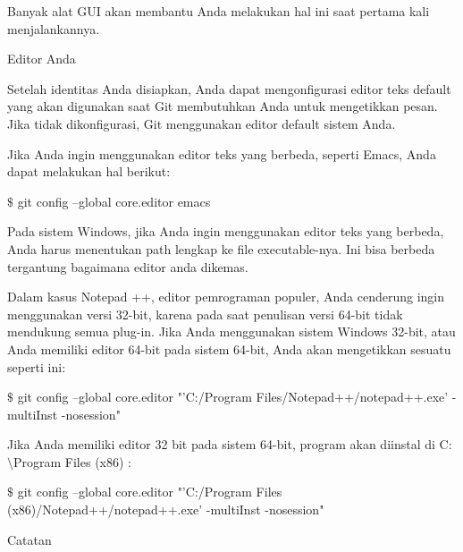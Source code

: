 \vspace{12pt}
\noindent 
Banyak alat GUI akan membantu Anda melakukan hal ini saat pertama kali menjalankannya. \par
\vspace{12pt}
\noindent 
Editor Anda \par
\vspace{12pt}
\noindent 
Setelah identitas Anda disiapkan, Anda dapat mengonfigurasi editor teks default yang akan digunakan saat Git membutuhkan Anda untuk mengetikkan pesan. $  $Jika tidak dikonfigurasi, Git menggunakan editor default sistem Anda. \par
\vspace{12pt}
\noindent 
Jika Anda ingin menggunakan editor teks yang berbeda, seperti Emacs, Anda dapat melakukan hal berikut: \par
\vspace{12pt}
\noindent 
  $  \$  $ git config --global core.editor emacs  \par
\vspace{12pt}
\noindent 
Pada sistem Windows, jika Anda ingin menggunakan editor teks yang berbeda, Anda harus menentukan path lengkap ke file executable-nya. $  $Ini bisa berbeda tergantung bagaimana editor anda dikemas. \par
\vspace{12pt}
\noindent 
Dalam kasus Notepad ++, editor pemrograman populer, Anda cenderung ingin menggunakan versi 32-bit, karena pada saat penulisan versi 64-bit tidak mendukung semua plug-in. $  $Jika Anda menggunakan sistem Windows 32-bit, atau Anda memiliki editor 64-bit pada sistem 64-bit, Anda akan mengetikkan sesuatu seperti ini: \par
\vspace{12pt}
\noindent 
  $  \$  $ git config --global core.editor "'C:/Program Files/Notepad++/notepad++.exe' -multiInst -nosession"  \par
\vspace{12pt}
\noindent 
Jika Anda memiliki editor 32 bit pada sistem 64-bit, program akan diinstal di $  $C: $  \setminus  $Program Files (x86) $  $: \par
\vspace{12pt}
\noindent 
  $  \$  $ git config --global core.editor "'C:/Program Files (x86)/Notepad++/notepad++.exe' -multiInst -nosession"  \par
\vspace{12pt}
\noindent 
Catatan \par
\vspace{12pt}
